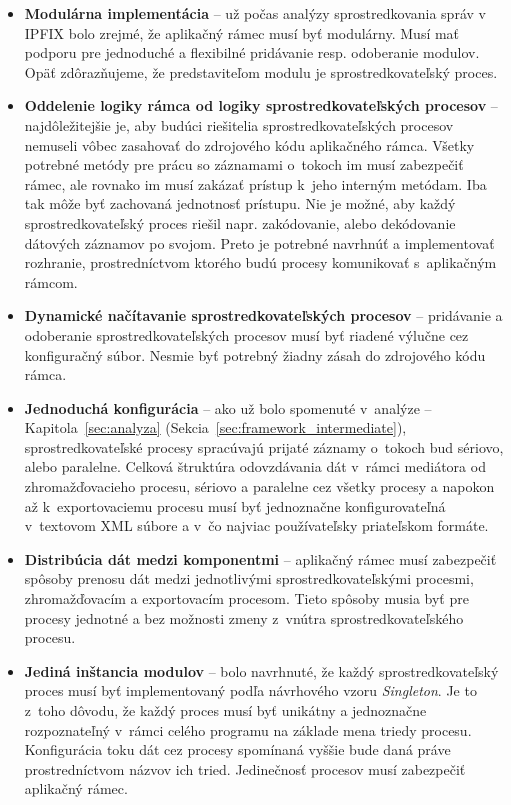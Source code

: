\begin{itemize}
 \item \textbf{Modulárna implementácia} -- už počas analýzy sprostredkovania správ v IPFIX bolo zrejmé, že 
 aplikačný rámec musí byť modulárny. Musí mať podporu pre jednoduché a flexibilné pridávanie resp. 
 odoberanie modulov. Opäť zdôrazňujeme, že predstaviteľom modulu je sprostredkovateľský proces.
 
  \item \textbf{Oddelenie logiky rámca od logiky sprostredkovateľských procesov} -- 
  najdôležitejšie je, aby budúci riešitelia sprostredkovateľských procesov nemuseli vôbec zasahovať 
  do zdrojového kódu aplikačného rámca. Všetky potrebné metódy pre prácu so záznamami o~tokoch 
  im musí zabezpečiť rámec, ale rovnako im musí zakázať prístup k~jeho interným metódam. 
  Iba tak môže byť zachovaná jednotnosť prístupu. Nie je možné, aby každý sprostredkovateľský proces 
  riešil napr. zakódovanie, alebo dekódovanie dátových záznamov po svojom. Preto je potrebné navrhnúť 
  a implementovať rozhranie, prostredníctvom ktorého budú procesy komunikovať s~aplikačným rámcom.
  
 \item \textbf{Dynamické načítavanie sprostredkovateľských procesov} -- pridávanie a odoberanie 
 sprostredkovateľských procesov musí byť riadené výlučne cez konfiguračný súbor. Nesmie byť potrebný 
 žiadny zásah do zdrojového kódu  rámca.
 
 \item \textbf{Jednoduchá konfigurácia} -- ako už bolo spomenuté v~analýze -- Kapitola~\ref{sec:analyza} 
 (Sekcia~\ref{sec:framework_intermediate}), 
 sprostredkovateľské procesy spracúvajú prijaté záznamy o~tokoch bud sériovo, alebo paralelne. 
 Celková štruktúra odovzdávania dát v~rámci mediátora od zhromažďovacieho procesu, sériovo a paralelne cez 
 všetky procesy a napokon až k~exportovaciemu procesu musí byť jednoznačne konfigurovateľná v~textovom 
 XML súbore a v~čo najviac používateľsky priateľskom formáte. 
 
 \item \textbf{Distribúcia dát medzi komponentmi} -- aplikačný rámec musí zabezpečiť spôsoby prenosu dát medzi 
 jednotlivými sprostredkovateľskými procesmi, zhromažďovacím a exportovacím procesom. Tieto spôsoby 
 musia byť pre procesy jednotné a bez možnosti zmeny z~vnútra sprostredkovateľského procesu.
 
 \item \textbf{Jediná inštancia modulov} -- bolo navrhnuté, že každý sprostredkovateľský
 proces musí byť implementovaný podľa návrhového vzoru \emph{Singleton}. Je to z~toho dôvodu, že 
 každý proces musí byť unikátny a jednoznačne rozpoznateľný v~rámci celého programu na 
 základe mena triedy procesu. Konfigurácia toku dát cez procesy spomínaná vyššie bude daná práve 
 prostredníctvom názvov ich tried. Jedinečnosť procesov musí zabezpečiť aplikačný rámec. 
 

\end{itemize}
